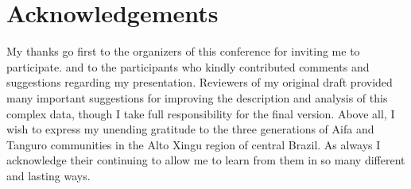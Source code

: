 \documentclass[output=paper]{langsci/langscibook}
\begin{document}
\section*{Acknowledgements}
My thanks go first to the organizers of this conference for inviting me to participate. and to the participants who kindly contributed comments and suggestions regarding my presentation.   Reviewers of my original draft provided many important suggestions for improving the description and analysis of this complex data,  though I take full responsibility for the final version.  Above all, I wish to express my unending gratitude to the three generations of Aifa and Tanguro communities in the Alto Xingu region of central Brazil.  As always I acknowledge their continuing to allow me to learn from them in so many different and lasting ways.  


\sloppy
\printbibliography[heading=subbibliography,notkeyword=this] 
\end{document}
